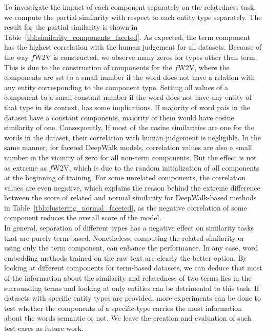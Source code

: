 To investigate the impact of each component separately on the relatedness task, we compute the partial similarity with respect to each entity type separately. The result for the partial similarity is shown in Table~\ref{tbl:similarity_components_faceted}. As expected, the term component has the highest correlation with the human judgement for all datasets. Because of the way $f$W2V is constructed, we observe many zeros for types other than term. This is due to the construction of components for the $f$W2V, where the components are set to a small number if the word does not have a relation with any entity corresponding to the component type. Setting all values of a component to a small constant number if the word does not have any entity of that type in its context, has some implications. If majority of  word pais in the dataset have a constant components, majority of them would have cosine similarity of one. Consequently, If most of the cosine similarities are one for the words in the dataset, their correlation with human judgement is negligible. In the same manner, for faceted DeepWalk models, correlation values are also a small number in the vicinity of zero for all non-term components. But the effect is not as extreme as $f$W2V, which is due to the random initialization of all components at the beginning of training. For some unrelated components, the correlation values are even negative, which explains the reason behind the extreme difference between the score of related and normal similarity for DeepWalk-based methods in Table~\ref{tbl:clustering_normal_faceted}, as the negative correlation of some component reduces the overall score of the model. \\
In general, separation of different types has a negative effect on similarity tasks that are purely term-based. Nonetheless, computing the related similarity or using only the term component, can enhance the performance. In any case, word embedding methods trained on the raw text are clearly the better option. By looking at different components for term-based datasets, we can deduce that most of the information about the similarity and relatedness of two terms lies in the surrounding terms and looking at only entities can be detrimental to this task. If datasets with specific entity types are provided, more experiments can be done to test whether the components of a specific-type carries the most information about the words semantic or not. We leave the creation and evaluation of such test cases as future work. \\ 
